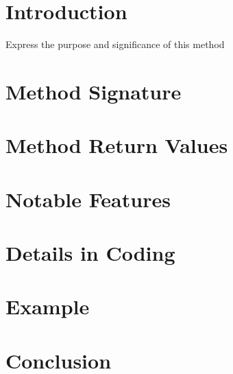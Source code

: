 

\section{Introduction}
\label{section:sampintro}
Express the purpose and significance of this method


\section{Method Signature}
\label{section:sampsig}


\section{Method Return Values}
\label{section:sampreturn}


\section{Notable Features}
\label{section:sampfeatures}


\section{Details in Coding}
\label{section:sampdetails}


\section{Example}
\label{section:example}


\section{Conclusion}
\label{section:conclusion}


